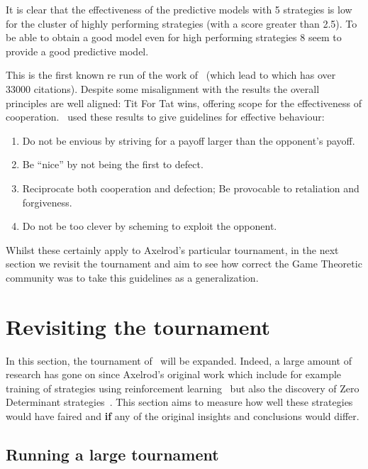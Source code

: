 \documentclass{article}
\begin{document}
It is clear that the effectiveness of the predictive models with 5 strategies is
low for the cluster of highly performing strategies (with a score greater than
2.5). To be able to obtain a good model even for high performing strategies 8
seem to provide a good predictive model.

This is the first known re run of the work of~\cite{Axelrod1980b} (which lead to
\cite{Axelrodbook} which has over 33000 citations). Despite some misalignment
with the results the overall principles are well aligned: Tit For Tat wins,
offering scope for the effectiveness of cooperation.~\cite{Axelrod1980b} used
these results to give guidelines for effective behaviour:

\begin{enumerate}
    \item Do not be envious by striving for a payoff larger than the opponent's payoff.
    \item Be ``nice'' by not being the first to defect.
    \item Reciprocate both cooperation and defection; Be provocable to retaliation and forgiveness.
    \item Do not be too clever by scheming to exploit the opponent.
\end{enumerate}

Whilst these certainly apply to Axelrod's particular tournament, in the next
section we revisit the tournament and aim to see
how correct the Game Theoretic community was to take this guidelines as a
generalization.

\section{Revisiting the tournament}\label{sec:revisiting}

In this section, the tournament of~\cite{Axelrod1980b} will be expanded.
Indeed, a large amount of research has gone on since Axelrod's original work
which include for example training of strategies using reinforcement
learning~\cite{Harper2017}
but also the discovery of Zero Determinant strategies~\cite{Press2012}. This
section aims to measure how well these strategies would have faired and
\textbf{if} any of the original insights and conclusions would differ.

\subsection{Running a large tournament}\label{sec:run_with_everyone}
\end{document}
